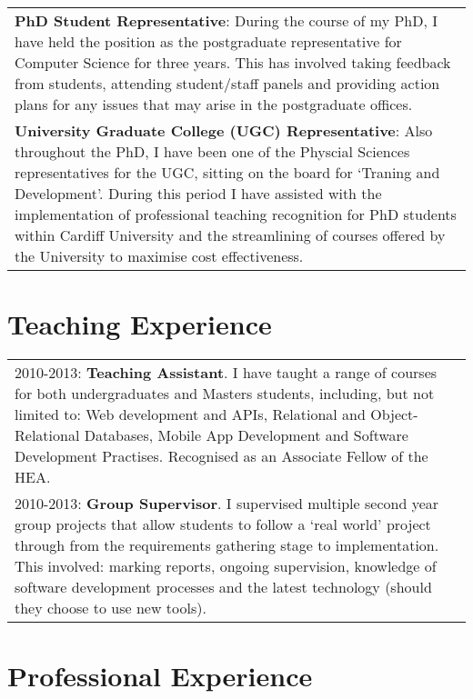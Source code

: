 \documentclass[11pt,fullpage]{article}
\begin{document}
\begin{tabular}{>{\everypar{\hangindent0.5in}}p{6in}}
	\textbf{PhD Student Representative}: During the course of my PhD, I have held the position as the postgraduate representative for Computer Science for three years. This has involved taking feedback from students, attending student/staff panels and providing action plans for any issues that may arise in the postgraduate offices. \\
	\textbf{University Graduate College (UGC) Representative}: Also throughout the PhD, I have been one of the Physcial Sciences representatives for the UGC, sitting on the board for `Traning and Development'. During this period I have assisted with the implementation of professional teaching recognition for PhD students within Cardiff University and the streamlining of courses offered by the University to maximise cost effectiveness. \\
\end{tabular}

\section*{Teaching Experience}

\begin{tabular}{>{\everypar{\hangindent0.5in}}p{6in}}
	2010-2013: \textbf{Teaching Assistant}. I have taught a range of courses for both undergraduates and Masters students, including, but not limited to: Web development and APIs, Relational and Object-Relational Databases, Mobile App Development and Software Development Practises. Recognised as an Associate Fellow of the HEA.\\
	2010-2013: \textbf{Group Supervisor}. I supervised multiple second year group projects that allow students to follow a `real world' project through from the requirements gathering stage to implementation.  This involved: marking reports, ongoing supervision, knowledge of software development processes and the latest technology (should they choose to use new tools).\\
\end{tabular}

\section*{Professional Experience}
\end{document}
